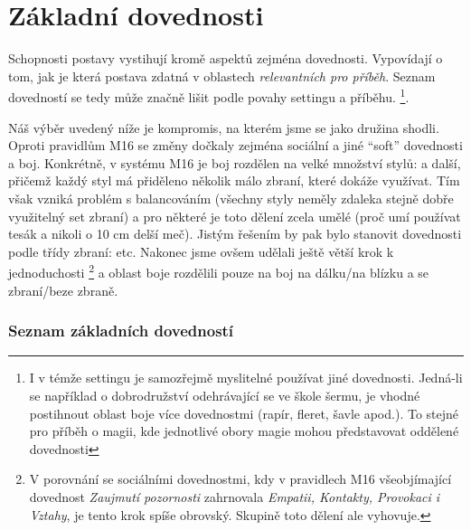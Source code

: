 \documentclass[../main.tex]{subfiles}
\begin{document}
\chapter{Základní dovednosti}
\label{chap:dovednosti}

Schopnosti postavy vystihují kromě aspektů zejména dovednosti. Vypovídají o tom, jak je která postava zdatná v oblastech \textit{relevantních pro příběh}. Seznam dovedností se tedy může značně lišit podle povahy settingu a příběhu. \footnote{I v témže settingu je samozřejmě myslitelné používat jiné dovednosti. Jedná-li se například o dobrodružství odehrávající se ve škole šermu, je vhodné postihnout oblast boje více dovednostmi (rapír, fleret, šavle apod.). To stejné pro příběh o magii, kde jednotlivé obory magie mohou představovat oddělené dovednosti}.

Náš výběr uvedený níže je kompromis, na kterém jsme se jako družina shodli. Oproti pravidlům M16 se změny dočkaly zejména sociální a jiné ``soft'' dovednosti a boj. Konkrétně, v systému M16 je boj rozdělen na velké množství stylů:  a další, přičemž každý styl má přiděleno několik málo zbraní, které dokáže využívat. Tím však vzniká problém s balancováním (všechny styly neměly zdaleka stejně dobře využitelný set zbraní) a pro některé je toto dělení zcela umělé (proč  umí používat tesák a nikoli o 10 cm delší meč). Jistým řešením by pak bylo stanovit dovednosti podle třídy zbraní:  etc. Nakonec jsme ovšem udělali ještě větší krok k jednoduchosti \footnote{V porovnání se sociálními dovednostmi, kdy v pravidlech M16 všeobjímající dovednost \textit{Zaujmutí pozornosti} zahrnovala \textit{Empatii, Kontakty, Provokaci i Vztahy}, je tento krok spíše obrovský. Skupině toto dělení ale vyhovuje.} a oblast boje rozdělili pouze na boj na dálku/na blízku a se zbraní/beze zbraně.


\subsection{Seznam základních dovedností}
\label{sec:seznam-dov}
\end{document}
